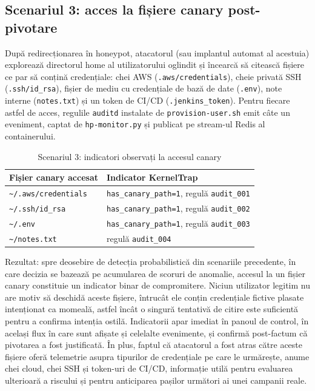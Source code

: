 \subsection{Scenariul 3: acces la fișiere canary post-pivotare}

După redirecționarea în honeypot, atacatorul (sau implantul automat al
acestuia) explorează directorul home al utilizatorului oglindit și
încearcă să citească fișiere ce par să conțină credențiale: chei AWS
(\texttt{.aws/credentials}), cheie privată SSH (\texttt{.ssh/id\_rsa}),
fișier de mediu cu credențiale de bază de date (\texttt{.env}), note interne
(\texttt{notes.txt}) și un token de CI/CD (\texttt{.jenkins\_token}).
Pentru fiecare astfel de acces, regulile \texttt{auditd} instalate de
\texttt{provision-user.sh} emit câte un eveniment, captat de
\texttt{hp-monitor.py} și publicat pe stream-ul Redis al containerului.

\begin{table}[h]
  \centering
  \caption{Scenariul 3: indicatori observați la accesul canary}
  \label{tab:cap6-scen3}
  \renewcommand{\arraystretch}{1.08}
  \begin{tabular}{|l|l|}
    \hline
    \textbf{Fișier canary accesat}     & \textbf{Indicator KernelTrap} \\
    \hline\hline
    \texttt{\textasciitilde/.aws/credentials} & \texttt{has\_canary\_path=1}, regulă \texttt{audit\_001} \\
    \hline
    \texttt{\textasciitilde/.ssh/id\_rsa}     & \texttt{has\_canary\_path=1}, regulă \texttt{audit\_002} \\
    \hline
    \texttt{\textasciitilde/.env}              & \texttt{has\_canary\_path=1}, regulă \texttt{audit\_003} \\
    \hline
    \texttt{\textasciitilde/notes.txt}         & regulă \texttt{audit\_004}  \\
    \hline
  \end{tabular}
\end{table}

Rezultat: spre deosebire de detecția probabilistică din scenariile precedente, în
care decizia se bazează pe acumularea de scoruri de anomalie, accesul la un fișier
canary constituie un indicator binar de compromitere. Niciun utilizator legitim
nu are motiv să deschidă aceste fișiere, întrucât ele conțin credențiale fictive
plasate intenționat ca momeală, astfel încât o singură tentativă de citire este
suficientă pentru a confirma intenția ostilă. Indicatorii apar imediat în panoul
de control, în același flux în care sunt afișate și celelalte evenimente, și
confirmă post-factum că pivotarea a fost justificată. În plus, faptul că
atacatorul a fost atras către aceste fișiere oferă telemetrie asupra tipurilor de
credențiale pe care le urmărește, anume chei cloud, chei SSH și token-uri de
CI/CD, informație utilă pentru evaluarea ulterioară a riscului și pentru
anticiparea pașilor următori ai unei campanii reale.

